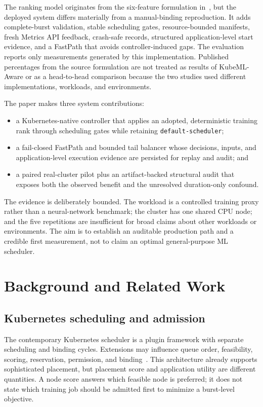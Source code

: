 \documentclass[10pt,journal,compsoc]{IEEEtran}
\newcommand{\system}{KubeML-Aware}
\begin{document}
The ranking model originates from the six-feature formulation in~\cite{abdelshaheed2025intelligent}, but the deployed system differs materially from a manual-binding reproduction. It adds complete-burst validation, stable scheduling gates, resource-bounded manifests, fresh Metrics API feedback, crash-safe records, structured application-level start evidence, and a FastPath that avoids controller-induced gaps. The evaluation reports only measurements generated by this implementation. Published percentages from the source formulation are not treated as results of \system{} or as a head-to-head comparison because the two studies used different implementations, workloads, and environments.

The paper makes three system contributions:
\begin{itemize}
  \item a Kubernetes-native controller that applies an adopted, deterministic training rank through scheduling gates while retaining \texttt{default-scheduler};
  \item a fail-closed FastPath and bounded tail balancer whose decisions, inputs, and application-level execution evidence are persisted for replay and audit; and
  \item a paired real-cluster pilot plus an artifact-backed structural audit that exposes both the observed benefit and the unresolved duration-only confound.
\end{itemize}

The evidence is deliberately bounded. The workload is a controlled training proxy rather than a neural-network benchmark; the cluster has one shared CPU node; and the five repetitions are insufficient for broad claims about other workloads or environments. The aim is to establish an auditable production path and a credible first measurement, not to claim an optimal general-purpose ML scheduler.

\section{Background and Related Work}

\subsection{Kubernetes scheduling and admission}

The contemporary Kubernetes scheduler is a plugin framework with separate scheduling and binding cycles. Extensions may influence queue order, feasibility, scoring, reservation, permission, and binding~\cite{kubernetesSchedulingFramework}. This architecture already supports sophisticated placement, but placement score and application utility are different quantities. A node score answers which feasible node is preferred; it does not state which training job should be admitted first to minimize a burst-level objective.
\end{document}
